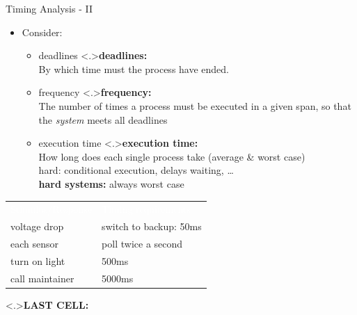 \documentclass[ngerman={babel}, utf8, bigger, xcolor={table,dvipsnames}, ompress, hyperref={bookmarks,colorlinks}]{beamer}
\begin{document}
\begin{frame}{Timing Analysis - II}
	\begin{itemize}
		\item Consider:
		\begin{itemize}
			\item deadlines
			\note<.>{\textbf{deadlines:}\\ By which time must the process have ended.}
			\item frequency
			\note<.>{\textbf{frequency:}\\ The number of times a process must be executed in a given span, so that the \emph{system} meets all deadlines}
			\item execution time
			\note<.>{\textbf{execution time:}\\ How long does each single process take (average \& worst case) \\ hard: conditional execution, delays waiting, \dots \\ \textbf{hard systems:} always worst case}
		\end{itemize}
	\end{itemize}
\end{frame}

\begin{frame}
	\begin{tabular}{p{9em}p{13em}}
		\rowcolor{blue}\hline \textcolor{white}{Stimulus/Response} & \textcolor{white}{Timing requirements} \\
		voltage drop & switch to backup: 50ms \pause \\
		each sensor & poll twice a second \pause \\
		turn on light & 500ms \pause \\
		call maintainer & 5000ms \\
	\end{tabular}
	{\textbf{LAST CELL:}\\}
\end{frame}
\end{document}
